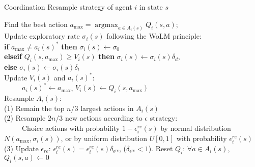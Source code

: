 \documentclass[journal,transmag]{IEEEtran}
\begin{document}
\begin{algorithm}[h]
\caption{Coordination Resample strategy of agent $i$ in state $s$}
\label{alg:SCC}
\begin{algorithmic}[1]
\STATE Find the best action ${a_{\max }} = \mathop {\arg \max }\nolimits_{a \in {A_i}(s)} {Q _i}(s,a)$;\\
\STATE Update exploratory rate $\sigma_{i}(s)$ following the WoLM principle:\\
       \textbf{if} ${a_{\max }} \neq a_{i}(s)^{*}$ \textbf{then} $\sigma_{i}(s)\leftarrow \sigma_0$\\
       \textbf{elseif} $Q_i(s,a_{\max }) \geq V_i(s)$ \textbf{then} $\sigma_{i}(s)\leftarrow \sigma_{i}(s)\delta_d$, \\
       \textbf{else} $\sigma_{i}(s)\leftarrow \sigma_{i}(s)\delta_l$ \\ \label{exploratory}
\STATE Update $V_{i}(s)$ and $a_{i}(s)^{*}$: \\
       ~~~~~$a_{i}(s)^{*} \leftarrow a_{\max }$, $V_{i}(s) \leftarrow Q_i(s,a_{\max })$ \\ \label{updateV}
\STATE Resample $A_i(s)$:\\ \label{resample}
       (1) Remain the top $n/3$ largest actions in $A_i(s)$\\
       (2) Resample $2n/3$ new actions according to $\epsilon$ strategy:\\
       ~~~~~Choice actions with probability $1-\epsilon_{i}^{re}(s)$ by normal distribution $N(a_{\max},\sigma_{i}(s))$, or by uniform distribution $U[0,1]$ with probability $\epsilon_i^{re}(s)$\\
       (3) Update $\epsilon_{re}$: $\epsilon_i^{re}(s)=\epsilon_i^{re}(s)\delta_{\epsilon^{re}}$, ($\delta_{\epsilon^{re}}<1$).
\STATE Reset $Q_i$: $\forall a\in A_i(s)$, $Q_{i}(s,a)\leftarrow 0$\label{reinitialize}
\end{algorithmic}
\end{algorithm}
\end{document}
